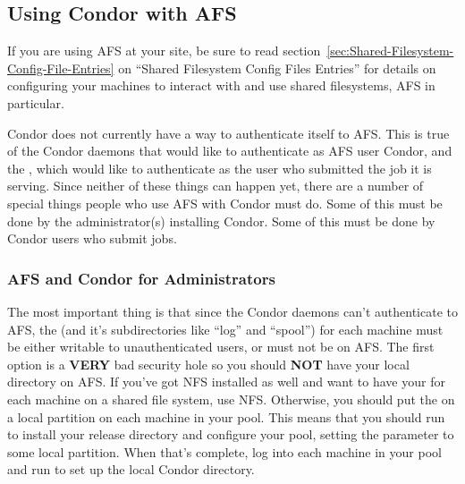 \subsection{\label{sec:Condor-AFS}Using Condor with AFS}

If you are using AFS at your site, be sure to read
section~\ref{sec:Shared-Filesystem-Config-File-Entries} on ``Shared
Filesystem Config Files Entries'' for details on configuring your
machines to interact with and use shared filesystems, AFS in
particular.

Condor does not currently have a way to authenticate itself to AFS.
This is true of the Condor daemons that would like to authenticate as
AFS user Condor, and the , which would like to
authenticate as the user who submitted the job it is serving.  Since
neither of these things can happen yet, there are a number of special
things people who use AFS with Condor must do.  Some of this must be
done by the administrator(s) installing Condor.  Some of this must be
done by Condor users who submit jobs.

\subsubsection{\label{sec:Condor-AFS-Admin}AFS and Condor for Administrators}

The most important thing is that since the Condor daemons can't
authenticate to AFS, the  (and it's subdirectories
like ``log'' and ``spool'') for each machine must be either writable
to unauthenticated users, or must not be on AFS.  The first option is
a \textbf{VERY} bad security hole so you should \textbf{NOT} have your
local directory on AFS.  If you've got NFS installed as well and want
to have your  for each machine on a shared file
system, use NFS.  Otherwise, you should put the  on
a local partition on each machine in your pool.  This means that you
should run  to install your release directory and
configure your pool, setting the  parameter to some
local partition.  When that's complete, log into each machine in your
pool and run  to set up the local Condor directory.

